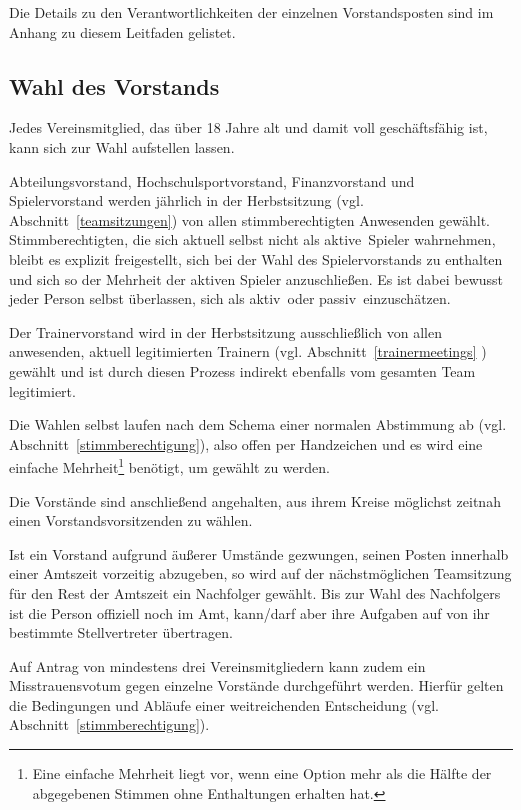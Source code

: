 \documentclass[a4 paper, 11pt]{article}
\begin{document}
Die Details zu den Verantwortlichkeiten der einzelnen Vorstandsposten sind im Anhang zu diesem Leitfaden gelistet.

\subsection{Wahl des Vorstands} \label{vorstandswahl}
Jedes Vereinsmitglied, das über 18 Jahre alt und damit voll geschäftsfähig ist, kann sich zur Wahl aufstellen lassen.

Abteilungsvorstand, Hochschulsportvorstand, Finanzvorstand und Spielervorstand werden jährlich in der Herbstsitzung (vgl. Abschnitt~\ref{teamsitzungen}) von allen stimmberechtigten Anwesenden gewählt. 
Stimmberechtigten, die sich aktuell selbst nicht als \glqq aktive\grqq\ Spieler wahrnehmen, bleibt es explizit freigestellt, sich bei der Wahl des Spielervorstands zu enthalten und sich so der Mehrheit der aktiven Spieler anzuschließen. Es ist dabei bewusst jeder Person selbst überlassen, sich als \glqq aktiv\grqq\ oder \glqq passiv\grqq\ einzuschätzen.

Der Trainervorstand wird in der Herbstsitzung ausschließlich von allen anwesenden, aktuell legitimierten Trainern (vgl. Abschnitt~\ref{trainermeetings} ) gewählt und ist durch diesen Prozess indirekt ebenfalls vom gesamten Team legitimiert.

Die Wahlen selbst laufen nach dem Schema einer normalen Abstimmung ab (vgl. Abschnitt~\ref{stimmberechtigung}), also offen per Handzeichen und es wird eine einfache Mehrheit\footnote{Eine einfache Mehrheit liegt vor, wenn eine Option mehr als die Hälfte der abgegebenen Stimmen ohne Enthaltungen erhalten hat.}
benötigt, um gewählt zu werden.

Die Vorstände sind anschließend angehalten, aus ihrem Kreise möglichst zeitnah einen Vorstandsvorsitzenden zu wählen.

Ist ein Vorstand aufgrund äußerer Umstände gezwungen, seinen Posten innerhalb einer Amtszeit vorzeitig abzugeben, so wird auf der nächstmöglichen Teamsitzung für den Rest der Amtszeit ein Nachfolger gewählt. Bis zur Wahl des Nachfolgers ist die Person offiziell noch im Amt, kann/darf aber ihre Aufgaben auf von ihr bestimmte Stellvertreter übertragen. 

Auf Antrag von mindestens drei Vereinsmitgliedern kann zudem ein Misstrauensvotum gegen einzelne Vorstände durchgeführt werden. Hierfür gelten die Bedingungen und Abläufe einer weitreichenden Entscheidung (vgl. Abschnitt~\ref{stimmberechtigung}).
\end{document}
